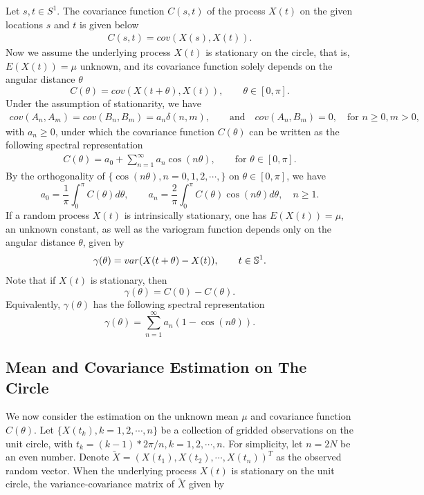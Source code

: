 Let $s, t \in S^1$. The covariance function $C(s, t)$ of the process $X(t)$ on the given locations $s$ and $t$ is given below
\begin{eqnarray*}
C(s, t) = cov(X(s), X(t)).
\end{eqnarray*}
Now we assume the underlying process $X(t)$ is stationary on the circle, that is, $E(X(t)) = \mu$ unknown, and its covariance function solely depends on the angular distance $\theta$
\[
C(\theta) = cov(X(t+\theta), X(t)), \quad \quad \theta \in [0, \pi].
\]
Under the assumption of stationarity, we have
\begin{eqnarray*}
cov(A_n, A_m) = cov(B_n, B_m) = a_n \delta(n, m), \quad\quad \mbox{and} \quad cov(A_n, B_m) = 0, \quad \mbox{for $n \ge 0, m > 0$},
\end{eqnarray*}
with $a_n \ge 0$, under which the covariance function $C(\theta)$ can be written as the following spectral representation
\begin{eqnarray*}
C(\theta) = a_0 + \sum_{n=1}^\infty a_n \cos(n\theta), \quad \quad \mbox{for $\theta \in [0, \pi]$}.
\end{eqnarray*}
By the orthogonality of $\{\cos(n\theta), n = 0, 1, 2, \cdots,\}$ on $\theta \in [0, \pi]$, we have
\[
a_0 = \frac{1}{\pi}\int_0^\pi C(\theta)d\theta, \quad \quad a_n = \frac{2}{\pi}\int_0^\pi C(\theta)\cos(n\theta)d\theta, \quad n \ge 1.
\]
If a random process $X(t)$ is intrinsically stationary, one has $E(X(t)) = \mu$, an unknown constant, as well as the variogram function depends only on the angular distance $\theta$, given by
\begin{eqnarray*}
\gamma(\theta) = var(X(t+\theta) - X(t)), \quad \quad t \in \mathbb{S}^1.
\end{eqnarray*}
Note that if $X(t)$ is stationary, then
\[
\gamma(\theta) = C(0) - C(\theta).
\]
Equivalently, $\gamma(\theta)$ has the following spectral representation
\[
\gamma(\theta) = \sum_{n = 1}^\infty a_n (1 - \cos(n\theta)).
\]



\subsection{Mean and Covariance Estimation on The Circle}

We now consider the estimation on the unknown mean $\mu$ and covariance function $C(\theta)$. Let $\{X(t_k), k = 1, 2, \cdots, n\}$ be a collection of gridded observations on the unit circle, with $t_k = (k-1)*2\pi/n, k = 1, 2, \cdots, n$. For simplicity, let $n = 2N$ be an even number. Denote $\utilde{X} = (X(t_1), X(t_2), \cdots, X(t_n))^T$ as the observed random vector. When the underlying process $X(t)$ is stationary on the unit circle, the variance-covariance matrix of $\utilde{X}$ given by

